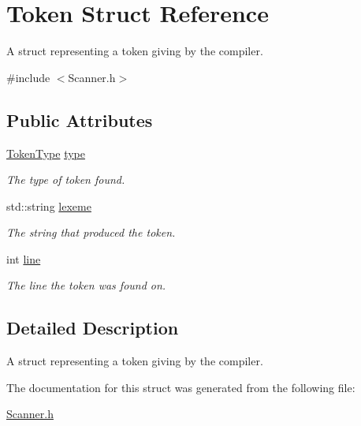 \hypertarget{struct_token}{}\section{Token Struct Reference}
\label{struct_token}


A struct representing a token giving by the compiler.  




{\ttfamily \#include $<$Scanner.\+h$>$}

\subsection*{Public Attributes}
\begin{DoxyCompactItemize}
\item 
\mbox{\label{struct_token_a67919af9f3a80dc0b28a0ab1e6d5bf8a}} 
\hyperlink{_scanner_8h_aa520fbf142ba1e7e659590c07da31921}{Token\+Type} \hyperlink{struct_token_a67919af9f3a80dc0b28a0ab1e6d5bf8a}{type}
\begin{DoxyCompactList}\small\item\em The type of token found. \end{DoxyCompactList}\item 
\mbox{\label{struct_token_abbff29ede445ed4a8520580f12490832}} 
std\+::string \hyperlink{struct_token_abbff29ede445ed4a8520580f12490832}{lexeme}
\begin{DoxyCompactList}\small\item\em The string that produced the token. \end{DoxyCompactList}\item 
\mbox{\label{struct_token_a4b96c2a31d7c374fd2bd1986794f80dd}} 
int \hyperlink{struct_token_a4b96c2a31d7c374fd2bd1986794f80dd}{line}
\begin{DoxyCompactList}\small\item\em The line the token was found on. \end{DoxyCompactList}\end{DoxyCompactItemize}


\subsection{Detailed Description}
A struct representing a token giving by the compiler. 

The documentation for this struct was generated from the following file\+:\begin{DoxyCompactItemize}
\item 
\hyperlink{_scanner_8h}{Scanner.\+h}\end{DoxyCompactItemize}
